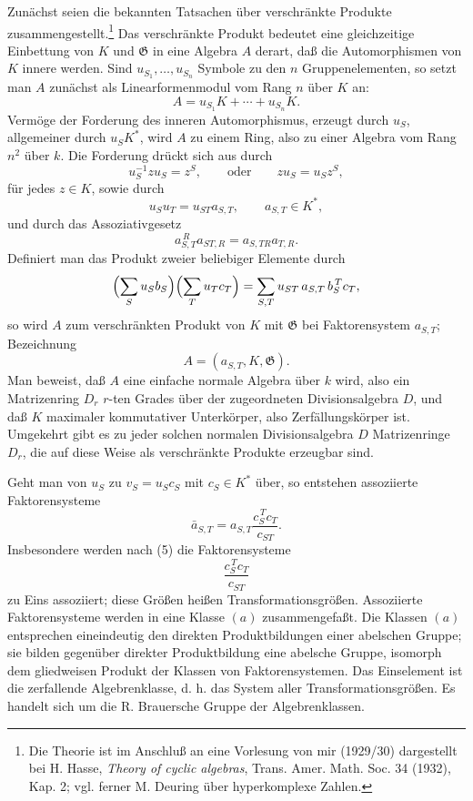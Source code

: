 \documentclass[11pt]{article}
\providecommand{\Gg}{\mathfrak G}
\begin{document}
Zunächst seien die bekannten Tatsachen über verschränkte Produkte zusammengestellt.\footnote{Die Theorie ist im Anschluß an eine Vorlesung von mir (1929/30) dargestellt bei H. Hasse, \emph{Theory of cyclic algebras}, Trans. Amer. Math. Soc. 34 (1932), Kap. 2; vgl. ferner M. Deuring über hyperkomplexe Zahlen.} Das verschränkte Produkt bedeutet eine gleichzeitige Einbettung von \(K\) und \(\Gg\) in eine Algebra \(A\) derart, daß die Automorphismen von \(K\) innere werden. Sind \(u_{S_1},\ldots,u_{S_n}\) Symbole zu den \(n\) Gruppenelementen, so setzt man \(A\) zunächst als Linearformenmodul vom Rang \(n\) über \(K\) an:
\[
        A=u_{S_1}K+\cdots+u_{S_n}K .                         \tag{1}
\]
Vermöge der Forderung des inneren Automorphismus, erzeugt durch \(u_S\), allgemeiner durch \(u_S K^*\), wird \(A\) zu einem Ring, also zu einer Algebra vom Rang \(n^2\) über \(k\). Die Forderung drückt sich aus durch
\[
        u_S^{-1}zu_S=z^S,\qquad\text{oder}\qquad
        z u_S=u_S z^S,                                      \tag{2}
\]
für jedes \(z\in K\), sowie durch
\[
        u_Su_T=u_{ST}a_{S,T},\qquad a_{S,T}\in K^*,           \tag{3}
\]
und durch das Assoziativgesetz
\[
        a_{S,T}^{\,R}a_{ST,R}=a_{S,TR}a_{T,R}.                \tag{4}
\]
Definiert man das Produkt zweier beliebiger Elemente durch
\[
 \Bigl(\sum_S u_S b_S\Bigr)\Bigl(\sum_T u_T c_T\Bigr)
   =\sum_{S,T}u_{ST}\,a_{S,T}\,b_S^{\,T}c_T ,
\]
so wird \(A\) zum verschränkten Produkt von \(K\) mit \(\Gg\) bei Faktorensystem \(a_{S,T}\); Bezeichnung
\[
        A=(a_{S,T},K,\Gg).
\]
Man beweist, daß \(A\) eine einfache normale Algebra über \(k\) wird, also ein Matrizenring \(D_r\) \(r\)-ten Grades über der zugeordneten Divisionsalgebra \(D\), und daß \(K\) maximaler kommutativer Unterkörper, also Zerfällungskörper ist. Umgekehrt gibt es zu jeder solchen normalen Divisionsalgebra \(D\) Matrizenringe \(D_r\), die auf diese Weise als verschränkte Produkte erzeugbar sind.

Geht man von \(u_S\) zu \(v_S=u_Sc_S\) mit \(c_S\in K^*\) über, so entstehen assoziierte Faktorensysteme
\[
        \bar a_{S,T}
        =a_{S,T}\frac{c_S^{\,T}c_T}{c_{ST}} .                 \tag{5}
\]
Insbesondere werden nach (5) die Faktorensysteme
\[
        \frac{c_S^{\,T}c_T}{c_{ST}}
\]
zu Eins assoziiert; diese Größen heißen Transformationsgrößen. Assoziierte Faktorensysteme werden in eine Klasse \((a)\) zusammengefaßt. Die Klassen \((a)\) entsprechen eineindeutig den direkten Produktbildungen einer abelschen Gruppe; sie bilden gegenüber direkter Produktbildung eine abelsche Gruppe, isomorph dem gliedweisen Produkt der Klassen von Faktorensystemen. Das Einselement ist die zerfallende Algebrenklasse, d. h. das System aller Transformationsgrößen. Es handelt sich um die R. Brauersche Gruppe der Algebrenklassen.
\end{document}
